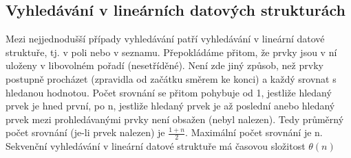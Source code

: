 \documentclass[10pt,a4paper]{article}
\begin{document}
\subsection{Vyhledávání v lineárních datových strukturách}
Mezi nejjednodušší případy vyhledávání patří vyhledávání v lineární datové struktuře, tj. v poli nebo v seznamu. Přepokládáme přitom, že prvky jsou v ní uloženy v libovolném pořadí (nesetříděné). Není zde jiný způsob, než prvky postupně procházet (zpravidla od začátku směrem ke konci) a každý srovnat s hledanou hodnotou. Počet srovnání se přitom pohybuje od 1, jestliže hledaný prvek je hned první, po n, jestliže hledaný prvek je až poslední anebo hledaný prvek mezi prohledávanými prvky není obsažen (nebyl nalezen). Tedy průměrný počet srovnání (je-li prvek nalezen) je $\frac{1+n}{2}$. Maximální počet srovnání je n. \\
Sekvenční vyhledávání v lineární datové struktuře má časovou složitost $\theta (n)$
\end{document}
